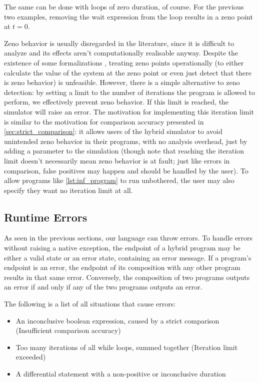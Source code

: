 The same can be done with loops of zero duration, of course. For the previous two examples, removing the wait expression from the loop results in a zeno point at $t=0$.

Zeno behavior is usually disregarded in the literature, since it is difficult to analyze and its effects aren't computationally realisable anyway. Despite the existence of some formalizations \cite{algebra_hybrid,goncharov19}, treating zeno points operationally (to either calculate the value of the system at the zeno point or even just detect that there is zeno behavior) is unfeasible. However, there is a simple alternative to zeno detection: by setting a limit to the number of iterations the program is allowed to perform, we effectively prevent zeno behavior. If this limit is reached, the simulator will raise an error. The motivation for implementing this iteration limit is similar to the motivation for comparison accuracy presented in \cref{sec:strict_comparison}: it allows users of the hybrid simulator to avoid unintended zeno behavior in their programs, with no analysis overhead, just by adding a parameter to the simulation (though note that reaching the iteration limit doesn't necessarily mean zeno behavior is at fault; just like errors in comparison, false positives may happen and should be handled by the user). To allow programs like \cref{lst:inf_program} to run unbothered, the user may also specify they want no iteration limit at all.


\subsection{Runtime Errors}

As seen in the previous sections, our language can throw errors. To handle errors without raising a native exception, the endpoint of a hybrid program may be either a valid state or an error state, containing an error message. If a program's endpoint is an error, the endpoint of its composition with any other program results in that same error. Conversely, the composition of two programs outputs an error if and only if any of the two programs outputs an error.

The following is a list of all situations that cause errors:
\begin{itemize}
  \item An inconclusive boolean expression, caused by a strict comparison (Insufficient comparison accuracy)
  \item Too many iterations of all while loops, summed together (Iteration limit exceeded)
  \item A differential statement with a non-positive or inconclusive duration
\end{itemize}


